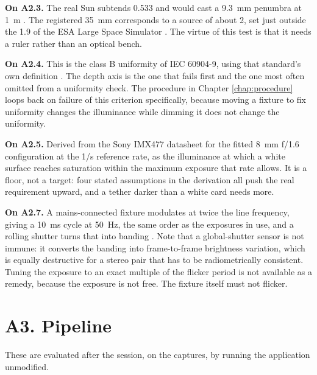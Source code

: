 \textbf{On A2.3.} The real Sun subtends 0.533\textdegree{} and would cast a
9.3~mm penumbra at 1~m \cite{prsa2016iau}. The registered 35~mm corresponds to
a source of about 2\textdegree, set just outside the 1.9\textdegree{} of the
ESA Large Space Simulator \cite{esa_lss}. The virtue of this test is that it
needs a ruler rather than an optical bench.

\textbf{On A2.4.} This is the class B uniformity of IEC 60904-9, using that
standard's own definition \cite{iec60904_9_2020}. The depth axis is the one
that fails first and the one most often omitted from a uniformity check. The
procedure in Chapter \ref{chap:procedure} loops back on failure of this
criterion specifically, because moving a fixture to fix uniformity changes
the illuminance while dimming it does not change the uniformity.

\textbf{On A2.5.} Derived from the Sony IMX477 datasheet
\cite{sony_imx477_datasheet} for the fitted 8~mm f/1.6 configuration at the
1\textdegree/s reference rate, as the illuminance at which a white surface
reaches saturation within the maximum exposure that rate allows. It is a
floor, not a target: four stated assumptions in the derivation all push the
real requirement upward, and a tether darker than a white card needs more.

\textbf{On A2.7.} A mains-connected fixture modulates at twice the line
frequency, giving a 10~ms cycle at 50~Hz, the same order as the exposures in
use, and a rolling shutter turns that into banding
\cite{sheinin2018rollingac}. Note that a global-shutter sensor is not immune:
it converts the banding into frame-to-frame brightness variation, which is
equally destructive for a stereo pair that has to be radiometrically
consistent. Tuning the exposure to an exact multiple of the flicker period is
not available as a remedy, because the exposure is not free. The fixture
itself must not flicker.

\section{A3. Pipeline}

These are evaluated after the session, on the captures, by running the
application unmodified.

